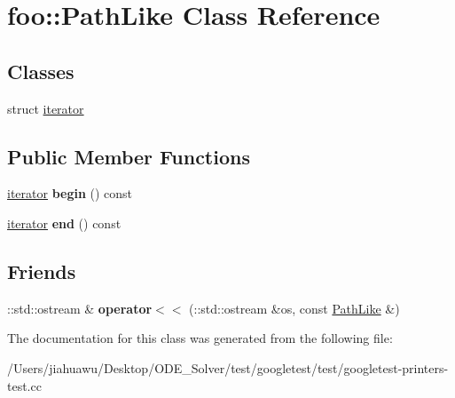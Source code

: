 \hypertarget{classfoo_1_1_path_like}{}\section{foo\+:\+:Path\+Like Class Reference}
\label{classfoo_1_1_path_like}
\subsection*{Classes}
\begin{DoxyCompactItemize}
\item 
struct \mbox{\hyperlink{structfoo_1_1_path_like_1_1iterator}{iterator}}
\end{DoxyCompactItemize}
\subsection*{Public Member Functions}
\begin{DoxyCompactItemize}
\item 
\mbox{\label{classfoo_1_1_path_like_a7ca8b63139fd6fcada55fbf13ccf9c83}} 
\mbox{\hyperlink{structfoo_1_1_path_like_1_1iterator}{iterator}} {\bfseries begin} () const
\item 
\mbox{\label{classfoo_1_1_path_like_aca85cd005890f1d19f416ca7e2c95f02}} 
\mbox{\hyperlink{structfoo_1_1_path_like_1_1iterator}{iterator}} {\bfseries end} () const
\end{DoxyCompactItemize}
\subsection*{Friends}
\begin{DoxyCompactItemize}
\item 
\mbox{\label{classfoo_1_1_path_like_ab5544a5497a8a470802bd8fcf97c49da}} 
\+::std\+::ostream \& {\bfseries operator$<$$<$} (\+::std\+::ostream \&os, const \mbox{\hyperlink{classfoo_1_1_path_like}{Path\+Like}} \&)
\end{DoxyCompactItemize}


The documentation for this class was generated from the following file\+:\begin{DoxyCompactItemize}
\item 
/\+Users/jiahuawu/\+Desktop/\+O\+D\+E\+\_\+\+Solver/test/googletest/test/googletest-\/printers-\/test.\+cc\end{DoxyCompactItemize}

